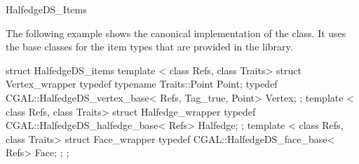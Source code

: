 \begin{ccRefConcept}{HalfedgeDS_Items}
\ccExample

The following example shows the canonical implementation of the
 class. It uses the base classes for the
item types that are provided in the library.

\begin{ccExampleCode}
struct HalfedgeDS_items {
    template < class Refs, class Traits>
    struct Vertex_wrapper {
        typedef typename Traits::Point Point;
        typedef CGAL::HalfedgeDS_vertex_base< Refs, Tag_true, Point> Vertex;
    };
    template < class Refs, class Traits>
    struct Halfedge_wrapper {
        typedef CGAL::HalfedgeDS_halfedge_base< Refs> Halfedge;
    };
    template < class Refs, class Traits>
    struct Face_wrapper {
        typedef CGAL::HalfedgeDS_face_base< Refs> Face;
    };
};
\end{ccExampleCode}

\end{ccRefConcept}

\ccRefPageEnd

